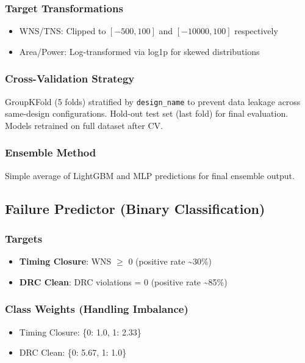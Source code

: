 \documentclass[10pt,conference]{IEEEtran}
\begin{document}
\subsubsection{Target Transformations}
\begin{itemize}
    \item WNS/TNS: Clipped to $[-500, 100]$ and $[-10000, 100]$ respectively
    \item Area/Power: Log-transformed via log1p for skewed distributions
\end{itemize}

\subsubsection{Cross-Validation Strategy}
GroupKFold (5 folds) stratified by \texttt{design\_name} to prevent data leakage across same-design configurations. Hold-out test set (last fold) for final evaluation. Models retrained on full dataset after CV.

\subsubsection{Ensemble Method}
Simple average of LightGBM and MLP predictions for final ensemble output.

\subsection{Failure Predictor (Binary Classification)}
\label{sec:failure_predictor}

\subsubsection{Targets}
\begin{itemize}
    \item \textbf{Timing Closure}: WNS $\ge$ 0 (positive rate \textasciitilde 30\%)
    \item \textbf{DRC Clean}: DRC violations = 0 (positive rate \textasciitilde 85\%)
\end{itemize}

\subsubsection{Class Weights (Handling Imbalance)}
\begin{itemize}
    \item Timing Closure: \{0: 1.0, 1: 2.33\}
    \item DRC Clean: \{0: 5.67, 1: 1.0\}
\end{itemize}
\end{document}

